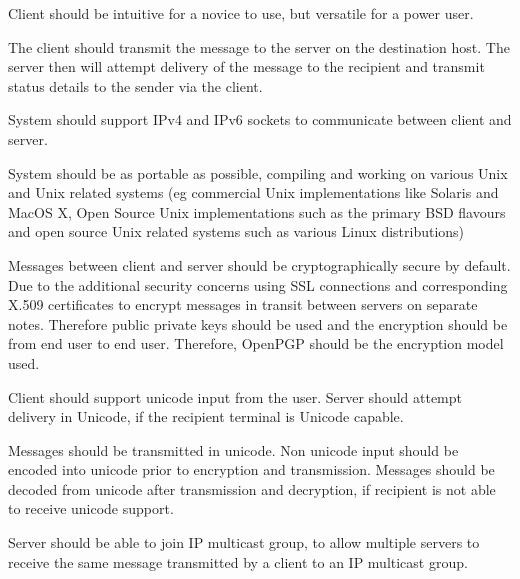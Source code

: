 
Client should be intuitive for a novice to use, but versatile for a
power user.


The client should transmit the message to the server on the destination
host. The server then will attempt delivery of the message to the
recipient and transmit status details to the sender via the client.


System should support IPv4 and IPv6 sockets to communicate between
client and server. 


System should be as portable as possible, compiling and working on 
various Unix and Unix related systems (eg commercial Unix
implementations like Solaris and MacOS X, Open Source Unix 
implementations such as the primary BSD flavours and open source Unix
related systems such as various Linux distributions) 


Messages between client and server should be cryptographically secure by
default. Due to the additional security concerns using SSL connections
and corresponding X.509 certificates to encrypt messages in transit
between servers on separate notes. Therefore public private keys should
be used and the encryption should be from end user to end user.
Therefore, OpenPGP should be the encryption model used.


Client should support unicode input from the user. Server should attempt
delivery in Unicode, if the recipient terminal is Unicode capable. 

Messages should be transmitted in unicode. Non unicode input should be
encoded into unicode prior to encryption and transmission. Messages
should be decoded from unicode after transmission and decryption, if
recipient is not able to receive unicode support. 


Server should be able to join IP multicast group, to allow multiple
servers to receive the same message transmitted by a client to an IP
multicast group. 
